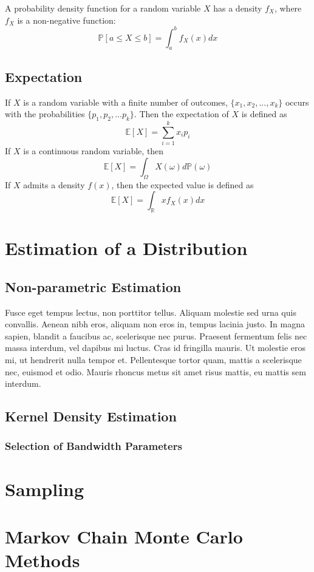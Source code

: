 A probability density function for a random variable $X$ has a density $f_X$, where $f_X$ is a non-negative function:
\begin{equation}
  \mathbb{P}[a \leq X \leq b]=\int_{a}^{b}f_{X}(x)dx
\end{equation}

\subsection{Expectation}
If $X$ is a random variable with a finite number of outcomes, $\{x_1,x_2,...,x_k\}$ occurs with the probabilities $\{p_1,p_2,...p_k\}$.  Then the expectation of $X$ is defined as
\begin{equation}
  \mathbb{E}[X]=\sum_{i=1}^{k}x_i p_i
\end{equation}
If $X$ is a continuous random variable, then
\begin{equation}
  \mathbb{E}[X]=\int_{\Omega} X(\omega) d\mathbb{P}(\omega)
\end{equation}
If $X$ admits a density $f(x)$, then the expected value is defined as
\begin{equation}
  \mathbb{E}[X]=\int_{\mathbb{R}}x f_{X}(x) dx
\end{equation}


\section{Estimation of a Distribution}

\subsection{Non-parametric Estimation}
 Fusce eget tempus lectus, non porttitor tellus. Aliquam molestie sed urna quis convallis. Aenean nibh eros, aliquam non eros in, tempus lacinia justo. In magna sapien, blandit a faucibus ac, scelerisque nec purus. Praesent fermentum felis nec massa interdum, vel dapibus mi luctus. Cras id fringilla mauris. Ut molestie eros mi, ut hendrerit nulla tempor et. Pellentesque tortor quam, mattis a scelerisque nec, euismod et odio. Mauris rhoncus metus sit amet risus mattis, eu mattis sem interdum.

\subsection{Kernel Density Estimation}
\subsubsection{Selection of Bandwidth Parameters}
\section{Sampling}

\section{Markov Chain Monte Carlo Methods}
